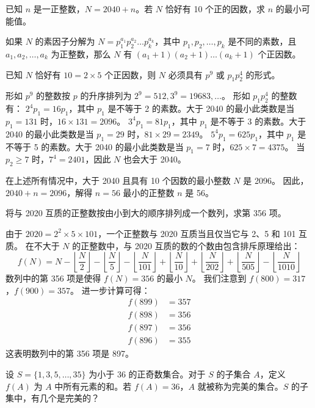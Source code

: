 \begin{questions}
\question
已知 $n$ 是一正整数，$N = 2040 + n$。若 $N$ 恰好有 10 个正的因数，求 $n$ 的最小可能值。

\begin{solution}
如果 $N$ 的素因子分解为 $N = p_1^{a_1} p_2^{a_2} \dots p_k^{a_k}$，其中 $p_1, p_2, \dots, p_k$ 是不同的素数，且 $a_1, a_2, \dots, a_k$ 为正整数，那么 $N$ 有 $(a_1 + 1)(a_2 + 1) \dots (a_k + 1)$ 个正因数。

已知 $N$ 恰好有 $10 = 2 \times 5$ 个正因数，则 $N$ 必须具有 $p^9$ 或 $p_1 p_2^4$ 的形式。

 形如 $p^9$ 的整数按 $p$ 的升序排列为 $2^9 = 512, 3^9 = 19683, \dots$。
 形如 $p_1 p_2^4$ 的整数有：
     $2^4 p_1 = 16p_1$，其中 $p_1$ 是不等于 2 的素数。大于 2040 的最小此类数是当 $p_1 = 131$ 时，$16 \times 131 = 2096$。
     $3^4 p_1 = 81p_1$，其中 $p_1$ 是不等于 3 的素数。大于 2040 的最小此类数是当 $p_1 = 29$ 时，$81 \times 29 = 2349$。
     $5^4 p_1 = 625p_1$，其中 $p_1$ 是不等于 5 的素数。大于 2040 的最小此类数是当 $p_1 = 7$ 时，$625 \times 7 = 4375$。
     当 $p_2 \ge 7$ 时，$7^4 = 2401$，因此 $N$ 也会大于 2040。


在上述所有情况中，大于 2040 且具有 10 个因数的最小整数 $N$ 是 2096。
因此，$2040 + n = 2096$，解得 $n = 56$
最小的正整数 $n$ 是 56。
\end{solution}


\question
将与 2020 互质的正整数按由小到大的顺序排列成一个数列，求第 356 项。

\begin{solution}
由于 $2020 = 2^2 \times 5 \times 101$，一个正整数与 2020 互质当且仅当它与 2、5 和 101 互质。
在不大于 $N$ 的正整数中，与 2020 互质的数的个数由包含排斥原理给出：
\[
f(N) = N - \left\lfloor \frac{N}{2} \right\rfloor - \left\lfloor \frac{N}{5} \right\rfloor - \left\lfloor \frac{N}{101} \right\rfloor + \left\lfloor \frac{N}{10} \right\rfloor + \left\lfloor \frac{N}{202} \right\rfloor + \left\lfloor \frac{N}{505} \right\rfloor - \left\lfloor \frac{N}{1010} \right\rfloor
\]
数列中的第 356 项是使得 $f(N) = 356$ 的最小 $N$。
我们注意到 $f(800) = 317$，$f(900) = 357$。
进一步计算可得：
\begin{align}
f(899) &= 357 \\
f(898) &= 356 \\
f(897) &= 356 \\
f(896) &= 355
\end{align}
这表明数列中的第 356 项是 897。
\end{solution}
\question
设 $S = \{1, 3, 5, \dots, 35\}$ 为小于 36 的正奇数集合。对于 $S$ 的子集合 $A$，定义 $f(A)$ 为 $A$ 中所有元素的和。若 $f(A) = 36$，$A$ 就被称为完美的集合。$S$ 的子集中，有几个是完美的？


\end{questions}
